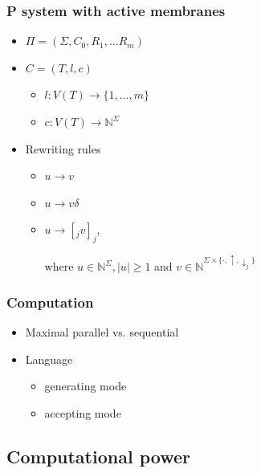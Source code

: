     \begin{frame}[t]\frametitle{P system with active membranes}
    \begin{itemize}
      \item $\Pi = (\Sigma, C_0, R_1, \ldots R_m)$
      \pause
      \item $C = (T, l, c)$
      \begin{itemize}
        \item $l: V(T) \rightarrow \{1, \ldots, m\}$
        \item $c: V(T) \rightarrow \mathbb{N}^\Sigma$
      \end{itemize}
      \pause
      \item Rewriting rules
      \begin{itemize}
        \item $u\rightarrow v$
        \item $u\rightarrow v\delta$
        \item $u\rightarrow [_j v]_j$,

        where $u \in \mathbb{N}^\Sigma, |u|\geq 1$ and $v\in \mathbb{N}^{\Sigma\times\{\cdot, \uparrow, \downarrow_{j}\}}$
      \end{itemize}

    \end{itemize}
    \end{frame}
    \note{}

    \begin{frame}[t]\frametitle{Computation}
      \begin{itemize}
        \item Maximal parallel vs. sequential
        \pause
        \item Language
        \begin{itemize}
          \item generating mode
          \item accepting mode
        \end{itemize}
      \end{itemize}

    \end{frame}
    \note{}


  \subsection{Computational power} %
  \label{sub:computational_power}
    
